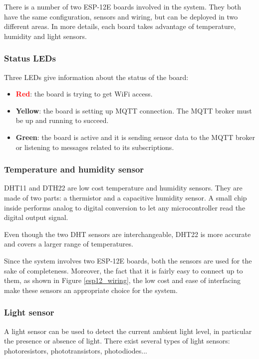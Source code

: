 \noindent
There is a number of two ESP-12E boards involved in the system. They both have the same configuration, sensors and wiring, but can be deployed in two different areas.
In more details, each board takes advantage of temperature, humidity and light sensors.

\subsubsection{Status LEDs}
Three LEDs give information about the status of the board:

\begin{itemize}
	\item \textbf{\textcolor{red}{Red}}: the board is trying to get WiFi access.
	\item \textbf{\textcolor[rgb]{1,0.8,0}{Yellow}}: the board is setting up MQTT connection. The MQTT broker must be up and running to succeed.
	\item \textbf{\textcolor[rgb]{0,0.6,0}{Green}}: the board is active and it is sending sensor data to the MQTT broker or listening to messages related to its subscriptions.
\end{itemize}

\subsubsection{Temperature and humidity sensor}
DHT11 and DTH22 are low cost temperature and humidity sensors. They are made of two parts: a thermistor and a capacitive humidity sensor. A small chip inside performs analog to digital conversion to let any microcontroller read the digital output signal.

Even though the two DHT sensors are interchangeable, DHT22 is more accurate and covers a larger range of temperatures.

Since the system involves two ESP-12E boards, both the sensors are used for the sake of completeness. Moreover, the fact that it is fairly easy to connect up to them, as shown in Figure \ref{esp12_wiring}, the low cost and ease of interfacing make these sensors an appropriate choice for the system.

\subsubsection{Light sensor}
A light sensor can be used to detect the current ambient light level, in particular the presence or absence of light. There exist several types of light sensors: photoresistors, phototransistors, photodiodes...

